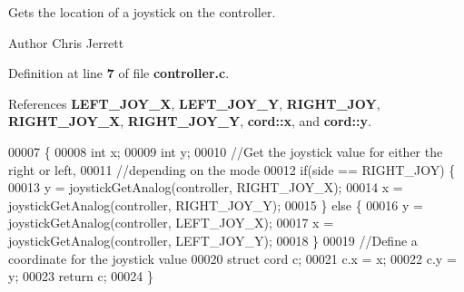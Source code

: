 Gets the location of a joystick on the controller. 

\begin{DoxyAuthor}{Author}
Chris Jerrett 
\end{DoxyAuthor}


Definition at line \textbf{ 7} of file \textbf{ controller.\+c}.



References \textbf{ L\+E\+F\+T\+\_\+\+J\+O\+Y\+\_\+X}, \textbf{ L\+E\+F\+T\+\_\+\+J\+O\+Y\+\_\+Y}, \textbf{ R\+I\+G\+H\+T\+\_\+\+J\+OY}, \textbf{ R\+I\+G\+H\+T\+\_\+\+J\+O\+Y\+\_\+X}, \textbf{ R\+I\+G\+H\+T\+\_\+\+J\+O\+Y\+\_\+Y}, \textbf{ cord\+::x}, and \textbf{ cord\+::y}.


\begin{DoxyCode}
00007                                                                   \{
00008   \textcolor{keywordtype}{int} x;
00009   \textcolor{keywordtype}{int} y;
00010   \textcolor{comment}{//Get the joystick value for either the right or left,}
00011   \textcolor{comment}{//depending on the mode}
00012   \textcolor{keywordflow}{if}(side == RIGHT_JOY) \{
00013     y = joystickGetAnalog(controller, RIGHT_JOY_X);
00014     x = joystickGetAnalog(controller, RIGHT_JOY_Y);
00015   \} \textcolor{keywordflow}{else} \{
00016     y = joystickGetAnalog(controller, LEFT_JOY_X);
00017     x = joystickGetAnalog(controller, LEFT_JOY_Y);
00018   \}
00019   \textcolor{comment}{//Define a coordinate for the joystick value}
00020   \textcolor{keyword}{struct }cord c;
00021   c.x = x;
00022   c.y = y;
00023   \textcolor{keywordflow}{return} c;
00024 \}
\end{DoxyCode}
